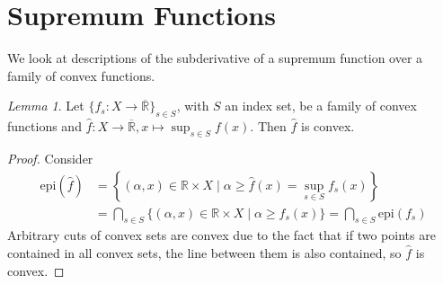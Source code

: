 \documentclass[10pt, leqno]{amsart}
\theoremstyle{definition}
\theoremstyle{remark}
\newtheorem{lemma}[theorem]{Lemma}
\newtheorem{remark}[theorem]{Remark}
\newtheorem{example}[theorem]{Example}
\newcommand{\draftcommentdone}{}
\begin{document}


    \section{Supremum Functions \draftcommentdone}

    We look at descriptions of the subderivative of a supremum function over a family of convex functions.

    \begin{lemma} \label{supremum_convexity_lemma}
        Let \(\{f_s\colon X \to \overline{\mathbb{R}}\}_{s \in S}\), with \(S\) an index set, be a family of convex functions and \(\hat{f}\colon X \to \overline{\mathbb{R}}, x \mapsto \sup_{s \in S} f(x)\). Then \(\hat{f}\) is convex.
    \end{lemma}

    \begin{proof}
        \draftcommentdone Consider
        \begin{align}
            \text{epi}(\hat{f}) &= \left\{(\alpha, x) \in \mathbb{R} \times X \mid \alpha \geq \hat{f}(x) = \sup_{s \in S} f_s(x)\right\}\\
            &= \bigcap_{s \in S} \{(\alpha, x) \in \mathbb{R} \times X \mid \alpha \geq f_s(x)\} = \bigcap_{s \in S} \text{epi}(f_s)
        \end{align}
        Arbitrary cuts of convex sets are convex due to the fact that if two points are contained in all convex sets, the line between them is also contained, so \(\hat{f}\) is convex.
    \end{proof}
\end{document}
